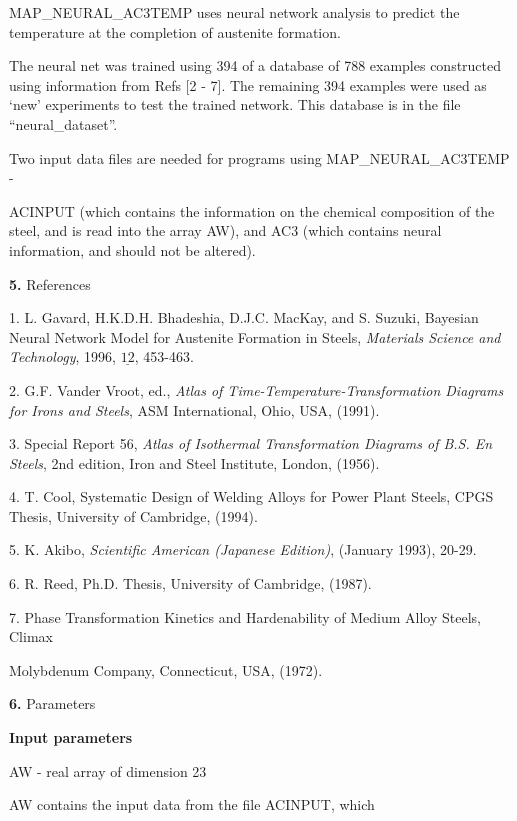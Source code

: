 \bigskip
\item {} MAP\_NEURAL\_AC3TEMP uses neural network analysis to predict the temperature
at the completion of austenite formation.
\medskip
\item {} The neural net was trained using 394 of a database of 788 examples
constructed using information from Refs [2 - 7]. The remaining 394 examples
were used as `new' experiments to test the trained network. This database
is in the file ``neural\_dataset''.
\medskip
\item {} Two input data files are needed for programs using MAP\_NEURAL\_AC3TEMP -
\item {} ACINPUT (which contains the information on the chemical composition of the
steel, and is read into the array AW), and AC3 (which contains neural information,
and should not be altered).
\item{\bf 5.} {\largeb  References}
\bigskip
\item {} 1. L. Gavard, H.K.D.H. Bhadeshia, D.J.C. MacKay, and S. Suzuki,
 Bayesian Neural Network Model for Austenite Formation in Steels,
{\it Materials Science and Technology}, 1996, $\underline {12}$, 453-463.
\medskip
\item {} 2. G.F. Vander Vroot, ed., {\it Atlas of 
Time-Temperature-Transformation Diagrams for Irons and Steels}, ASM 
International, Ohio, USA, (1991).
\medskip
\item {} 3. Special Report 56, {\it Atlas of Isothermal Transformation
Diagrams of B.S. En Steels}, 2nd edition, Iron and Steel Institute, London,
(1956).
\medskip
\item {} 4. T. Cool, Systematic Design of Welding Alloys for Power Plant
Steels, CPGS Thesis, University of Cambridge, (1994).
\medskip
\item {} 5. K. Akibo, {\it Scientific American (Japanese Edition)},
(January 1993), 20-29.
\medskip
\item {} 6. R. Reed, Ph.D. Thesis, University of Cambridge, (1987).
\medskip
\item {} 7. Phase Transformation Kinetics and Hardenability of Medium Alloy
Steels, Climax \item {} Molybdenum Company, Connecticut, USA, (1972).
\item{\bf 6.} {\largeb  Parameters}
\bigskip
\item {} {\bf Input parameters}
\bigskip
\item {} AW - real array of dimension 23
\item {} \indent AW contains the input data from the file ACINPUT, which
